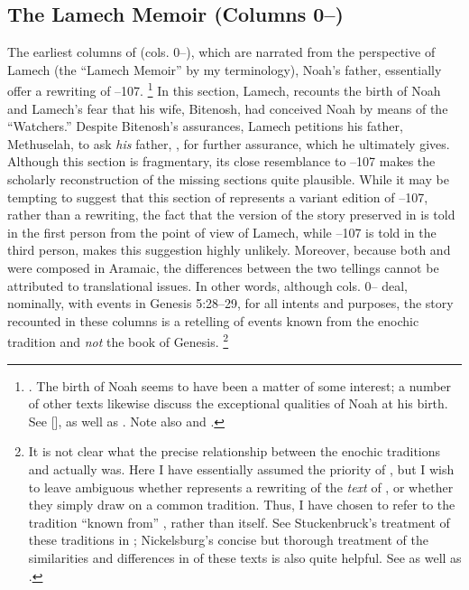 \subsection{The Lamech Memoir (Columns 0--)}
The earliest columns of \ga (cols. 0--), which are narrated from the perspective of Lamech (the ``Lamech Memoir'' by my terminology), Noah's father, essentially offer a rewriting of --107.%
    \footnote{\Cite[174]{nickelsburg2005}. The birth of Noah seems to have been a matter of some interest; a number of other texts likewise discuss the exceptional qualities of Noah at his birth. See [],  as well as \cite{vanderkam_kapera1992}. Note also \cite{stuckenbruck_berthelot-etal2010} and \cite{baxter_jsp2006}.}
In this section, Lamech, recounts the birth of Noah and Lamech's fear that his wife, Bitenosh, had conceived Noah by means of the  ``Watchers.'' Despite Bitenosh's assurances, Lamech petitions his father, Methuselah, to ask \emph{his} father, \enoch, for further assurance, which he ultimately gives. Although this section is fragmentary, its close resemblance to --107 makes the scholarly reconstruction of the missing sections quite plausible. While it may be tempting to suggest that this section of \ga represents a variant edition of --107, rather than a rewriting, the fact that the version of the story preserved in \ga is told in the first person from the point of view of Lamech, while --107 is told in the third person, makes this suggestion highly unlikely. Moreover, because both \firstenoch and \ga were composed in Aramaic, the differences between the two tellings cannot be attributed to translational issues. In other words, although cols. 0-- deal, nominally, with events in Genesis 5:28--29, for all intents and purposes, the story recounted in these columns is a retelling of events known from the enochic tradition and \emph{not} the book of Genesis.%
    \footnote{It is not clear what the precise relationship between the enochic traditions and \ga actually was. Here I have essentially assumed the priority of \firstenoch, but I wish to leave ambiguous whether \ga represents a rewriting of the \emph{text} of \firstenoch, or whether they simply draw on a common tradition. Thus, I have chosen to refer to the tradition ``known from'' \firstenoch, rather than \firstenoch itself. See Stuckenbruck's treatment of these traditions in \cite*{stuckenbruck_berthelot-etal2010}; Nickelsburg's concise but thorough treatment of the similarities and differences in of these texts is also quite helpful. See \cite[173--174]{nickelsburg2005} as well as \cite[122--123]{fitzmyer2004}.} 


